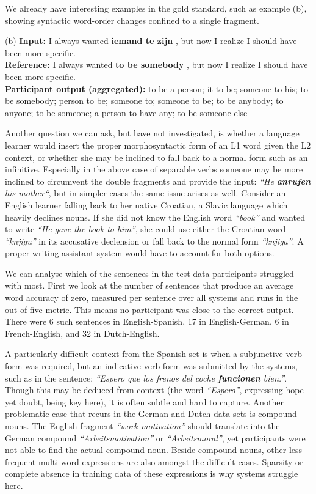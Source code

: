 We already have interesting examples in the gold standard, such as example (b),
showing syntactic word-order changes confined to a single fragment.

\begin{examples}
\footnotesize
\item[(b)] \textbf{Input:} I always wanted \textbf{iemand te zijn} , but now I realize I should have been more specific.\\
\textbf{Reference:} I always wanted \textbf{to be somebody} , but now I realize I should have been more specific.\\
\textbf{Participant output (aggregated):} to be a person; it to be; someone to his; to be somebody; person to be; someone to; someone to be; to be anybody; to anyone; to be someone; a person to have any; to be someone else
\end{examples}

Another question we can ask, but have not investigated, is whether a language
learner would insert the proper morphosyntactic form of an L1 word given the L2
context, or whether she may be inclined to fall back to a normal form such as
an infinitive. Especially in the above case of separable verbs someone may be
more inclined to circumvent the double fragments and provide the input:
\emph{``He \textbf{anrufen} his mother``}, but in simpler cases the same issue
arises as well. Consider an English learner falling back to her native
Croatian, a Slavic language which heavily declines nouns. If she did not know
the English word \emph{``book''} and wanted to write \emph{``He gave the book
to him''}, she could use either the Croatian word \emph{``knjigu''} in its
accusative declension or fall back to the normal form \emph{``knjiga''}. A
proper writing assistant system would have to account for both options.

We can analyse which of the sentences in the test data participants struggled
with most. First we look at the number of sentences that produce an average
word accuracy of zero, measured per sentence over all systems and runs in the
out-of-five metric. This means no participant was close to the correct output.
There were 6 such sentences in English-Spanish, 17 in English-German, 6 in
French-English, and 32 in Dutch-English.

A particularly difficult context from the Spanish set is when a subjunctive
verb form was required, but an indicative verb form was submitted by the
systems, such as in the sentence: \emph{``Espero que los frenos del coche
\textbf{funcionen} bien.''}. Though this may be deduced from context (the word
\emph{``Espero''}, expressing hope yet doubt, being key here), it is often
subtle and hard to capture. Another problematic case that recurs in the German
and Dutch data sets is compound nouns. The English fragment \emph{``work
motivation''} should translate into the German compound
\emph{``Arbeitsmotivation''} or \emph{``Arbeitsmoral''}, yet participants were
not able to find the actual compound noun. Beside compound nouns, other less
frequent multi-word expressions are also amongst the difficult cases. Sparsity
or complete absence in training data of these expressions is why systems
struggle here.


